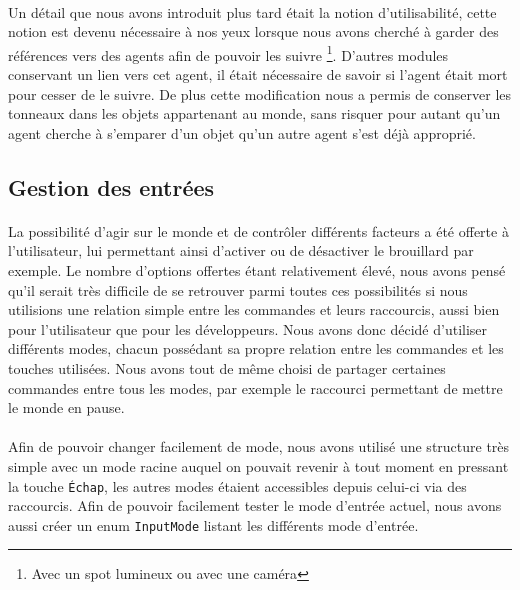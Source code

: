 \paragraph{}
Un détail que nous avons introduit plus tard était la notion d'utilisabilité,
cette notion est devenu nécessaire à nos yeux lorsque nous avons cherché à
garder des références vers des agents afin de pouvoir les suivre
\footnote{Avec un spot lumineux ou avec une caméra}. D'autres modules
conservant un lien vers cet agent, il était nécessaire de savoir si l'agent
était mort pour cesser de le suivre. De plus cette modification nous a permis
de conserver les tonneaux dans les objets appartenant au monde, sans risquer
pour autant qu'un agent cherche à s'emparer d'un objet qu'un autre agent s'est
déjà approprié.

\subsection{Gestion des entrées}
\paragraph{}
La possibilité d'agir sur le monde et de contrôler différents facteurs a été
offerte à l'utilisateur, lui permettant ainsi d'activer ou de désactiver le
brouillard par exemple. Le nombre d'options offertes étant relativement
élevé, nous avons pensé qu'il serait très difficile de se retrouver parmi toutes
ces possibilités si nous utilisions une relation simple entre les commandes et leurs raccourcis, aussi bien pour l'utilisateur que pour les développeurs.
Nous avons donc décidé
d'utiliser différents modes, chacun possédant sa propre relation entre les
commandes et les touches utilisées. Nous avons tout de même choisi de partager
certaines commandes entre tous les modes, par exemple le raccourci permettant
de mettre le monde en pause.

\paragraph{}
Afin de pouvoir changer facilement de mode, nous avons utilisé une structure
très simple avec un mode racine auquel on pouvait revenir à tout moment en
pressant la touche \verb!Échap!, les autres modes étaient accessibles depuis
celui-ci via des raccourcis. Afin de pouvoir facilement tester le mode
d'entrée actuel, nous avons aussi créer un enum \verb!InputMode! listant les
différents mode d'entrée.

